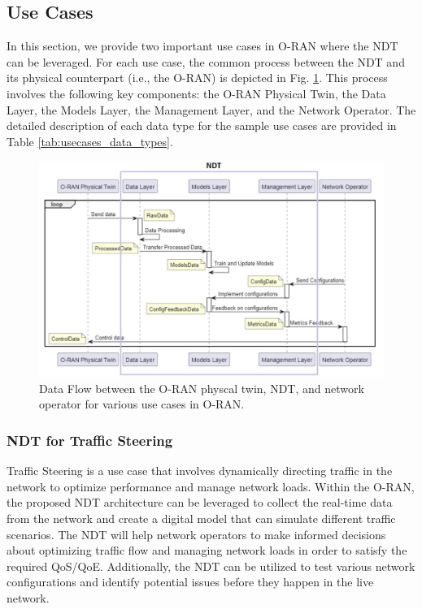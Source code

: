 \documentclass[]{IEEEtran}
\begin{document}
\subsection{Use Cases}
In this section, we provide two important use cases in O-RAN where the NDT can be leveraged. For each use case, the common process between the NDT and its physical counterpart (i.e., the O-RAN) is depicted in Fig. \ref{fig:usecaseseq}. This process involves the following key components: the O-RAN Physical Twin, the Data Layer, the Models Layer, the Management Layer, and the Network Operator. The detailed description of each data type for the sample use cases are provided in Table  \ref{tab:usecases_data_types}.

\begin{figure}[hbt!]
	\centering
	\includegraphics[width=.77\linewidth]{useCaseSeq2}
	\caption{Data Flow between the O-RAN physcal twin,  NDT, and network operator for various use cases in O-RAN.}
	\label{fig:usecaseseq}
\end{figure}	

\subsubsection{NDT for Traffic Steering}
Traffic Steering is a use case that involves dynamically directing traffic in the network to optimize performance and manage network loads. Within the O-RAN, the proposed NDT architecture can be leveraged to collect the real-time data from the network and create a digital model that can simulate different traffic scenarios. The NDT will help network operators to make informed decisions about optimizing traffic flow and managing network loads in order to satisfy the required QoS/QoE. Additionally, the NDT can be utilized to test various network configurations and identify potential issues before they happen in the live network. 
\end{document}
